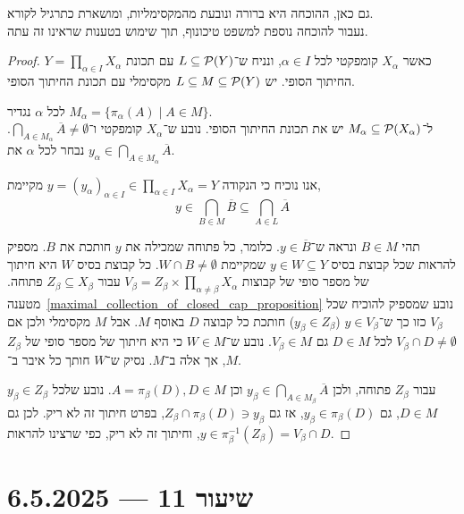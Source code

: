 גם כאן, ההוכחה היא ברורה ונובעת מהמקסימליות, ומושארת כתרגיל לקורא. \\
נעבור להוכחה נוספת למשפט טיכונוף, תוך שימוש בטענות שראינו זה עתה.
\begin{proof}
	$Y = \prod_{\alpha \in I} X_{\alpha}$ כאשר $X_{\alpha}$ קומפקטי לכל $\alpha \in I$, ונניח ש־$L \subseteq \mathcal{P}(Y)$ עם תכונת החיתוך הסופי.
	יש $L \subseteq M \subseteq \mathcal{P}(Y)$ מקסימלי עם תכונת החיתוך הסופי.

	לכל $\alpha$ נגדיר $M_{\alpha} = \{ \pi_{\alpha}(A) \mid A \in M \}$. \\
	ל־$M_{\alpha} \subseteq \mathcal{P}(X_{\alpha})$ יש את תכונת החיתוך הסופי.
	נובע ש־$X_{\alpha}$ קומפקטי ו־$\bigcap_{A \in M_{\alpha}} \overline{A} \ne \emptyset$.
	נבחר לכל $\alpha$ את $y_{\alpha} \in \bigcap_{A \in M_{\alpha}} \overline{A}$.

	אנו נוכיח כי הנקודה $y = {( y_{\alpha} )}_{\alpha \in I} \in \prod_{\alpha \in I} X_{\alpha} = Y$ מקיימת,
	\[
		y \in \bigcap_{B \in M} \overline{B}
		\subseteq \bigcap_{A \in L} \overline{A}
	\]

	תהי $B \in M$ ונראה ש־$y \in \overline{B}$.
	כלומר, כל פתוחה שמכילה את $y$ חותכת את $B$.
	מספיק להראות שכל קבוצת בסיס $y \in W \subseteq Y$ שמקיימת $W \cap B \ne \emptyset$. 
	כל קבוצת בסיס $W$ היא חיתוך של מספר סופי של קבוצות $V_{\beta} = Z_{\beta} \times \prod_{\alpha \ne \beta} X_{\alpha}$ עבור $Z_{\beta} \subseteq X_{\beta}$ פתוחה.
	מטענה\ \ref{maximal_collection_of_closed_cap_proposition} נובע שמספיק להוכיח שכל $V_{\beta}$ כזו כך ש־$y \in V_{\beta}$ ($y_{\beta} \in Z_{\beta}$) חותכת כל קבוצה $D$ באוסף $M$.
	אבל $M$ מקסימלי ולכן אם $V_{\beta} \cap D \ne \emptyset$ לכל $D \in M$ גם $V_{\beta} \in M$.
	נובע ש־$W \in M$ כי היא חיתוך של מספר סופי של $Z_{\beta}$, אך אלה ב־$M$.
	נסיק ש־$W$ חותך כל איבר ב־$M$.

	$y_{\beta} \in Z_{\beta}$ עבור $Z_{\beta}$ פתוחה, ולכן $y_{\beta} \in \bigcap_{A \in M_{\beta}} \overline{A}$ וכן $A = \pi_{\beta}(D), D \in M$.
	נובע שלכל $D \in M$, גם $y_{\beta} \in \pi_{\beta}(D)$, אז גם $Z_{\beta} \cap \pi_{\beta}(D) \ni y_{\beta}$, בפרט חיתוך זה לא ריק.
	לכן גם $y \in \pi_{\beta}^{-1}(Z_{\beta}) = V_{\beta} \cap D$, וחיתוך זה לא ריק, כפי שרצינו להראות.
\end{proof}

\section{שיעור 11 --- 6.5.2025}

